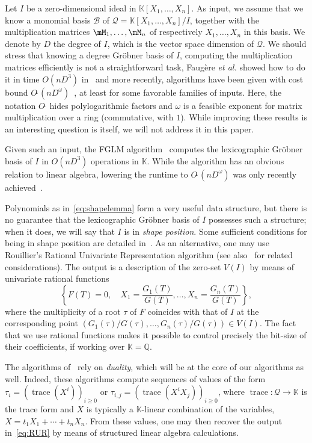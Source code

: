 \documentclass[12pt]{article}
\newcommand{\basis}{\mathscr{B}}
\newcommand{\trace}{\operatorname{trace}}
\newcommand{\softO}[1]{O{\tilde{~}}(#1)} %
\newcommand{\lf}{X}
\newcommand{\residueI}{\mathscr{Q}}
\def\Q {\ensuremath{\mathbb{Q}}}
\def\K{\mathbb{K}}
\def\K {\ensuremath{\mathbb{K}}}
\begin{document}
 Let $I$ be a zero-dimensional ideal in $\K[X_1,\dots,X_n]$.  As
 input, we assume that we know a monomial basis $\basis$ of
 $\residueI=\K[X_1,\dots,X_n]/I$, together with the multiplication matrices
 $\mM_1,\dots,\mM_n$ of respectively $X_1,\dots,X_n$ in this basis. We
 denote by $D$ the degree of $I$, which is the vector space dimension
 of $\residueI$. We should stress that knowing a degree Gr\"obner basis of
 $I$, computing the multiplication matrices efficiently is not a
 straightforward task, Faug\`ere {\it et al.} showed how to do it in
 time $O(nD^3)$ in~\cite{FaGiLaMo93} and more recently, algorithms have
 been given with cost bound
 $\softO{nD^\omega}$~\cite{FaGaHuRe13,FaGaHuRe14,Neiger16}, at
 least for some favorable families of inputs. Here, the notation
 $O\tilde{~}$ hides polylogarithmic factors and $\omega$ is a feasible
 exponent for matrix multiplication over a ring (commutative, with $1$). While
 improving these results is an interesting question is itself, we will not
 address it in this paper.

Given such an input, the FGLM algorithm~\cite{FaGiLaMo93} computes the
lexicographic Gr\"obner basis of $I$ in $O(nD^3)$ operations in $\K$.
While the algorithm has an obvious relation to linear algebra,
lowering the runtime to $O\tilde{~}(nD^\omega)$ was only recently
achieved~\cite{FaGaHuRe13,FaGaHuRe14,Neiger16}. 

Polynomials as in~\cref{eq:shapelemma} form a very useful data
structure, but there is no guarantee that the lexicographic Gr\"obner
basis of $I$ possesses such a structure; when it does, we will say
that $I$ is in {\em shape position}. Some sufficient conditions for being in
shape position are detailed in~\cite{BeMoMaTr94}. 
As an alternative, one may use Rouillier's
Rational Univariate Representation algorithm \cite{Rouillier99} (see
also~\cite{AlBeRoWo94,BeWo96} for related considerations). The output
is a description of the zero-set $V(I)$ by means of univariate rational
functions
\begin{equation}\label{eq:RUR}
 \left\{  F(T)=0, \quad X_1 = \frac{G_1(T)}{G(T)}, \dots,X_n = \frac{G_n(T)}{G(T)} \right\},
\end{equation}
where the multiplicity of a root $\tau$ of $F$ coincides with that of
$I$ at the corresponding point
$(G_1(\tau)/G(\tau),\dots,G_n(\tau)/G(\tau)) \in V(I)$. The fact that
we use rational functions makes it possible to control
precisely the bit-size of their coefficients, if working over $\K=\Q$.

The algorithms of~\cite{AlBeRoWo94, BeWo96, Rouillier99} rely on
\emph{duality}, which will be at the core of our algorithms as well.
Indeed, these algorithms compute sequences of values of the form
$\tau_i=(\trace(\lf^i))_{i \ge 0}$ or 
$\tau_{i,j}=(\trace(\lf^i X_j))_{i \ge 0}$, where $\trace: \residueI \to \K$ is the trace 
form and $\lf$ is typically a $\K$-linear combination of the variables,
$\lf=t_1 X_1 + \cdots + t_n X_n$.
From these values, one may then recover the output in~\cref{eq:RUR} by means
of structured linear algebra calculations.
\end{document}
